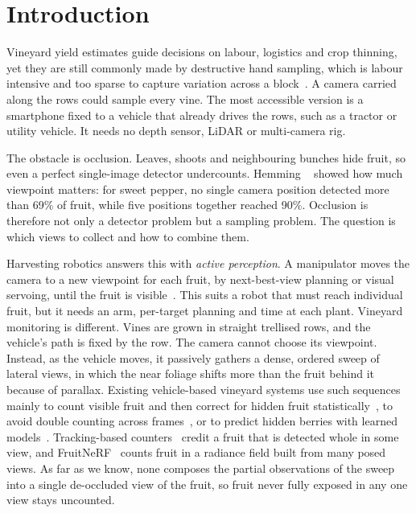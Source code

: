 \section{Introduction}
Vineyard yield estimates guide decisions on labour, logistics and crop thinning, yet they are still commonly made by destructive hand sampling, which is labour intensive and too sparse to capture variation across a block~\cite{nuske2014}. A camera carried along the rows could sample every vine. The most accessible version is a smartphone fixed to a vehicle that already drives the rows, such as a tractor or utility vehicle. It needs no depth sensor, LiDAR or multi-camera rig.

The obstacle is occlusion. Leaves, shoots and neighbouring bunches hide fruit, so even a perfect single-image detector undercounts. Hemming \etal~\cite{hemming2014} showed how much viewpoint matters: for sweet pepper, no single camera position detected more than 69\% of fruit, while five positions together reached 90\%. Occlusion is therefore not only a detector problem but a sampling problem. The question is which views to collect and how to combine them.

Harvesting robotics answers this with \emph{active perception}. A manipulator moves the camera to a new viewpoint for each fruit, by next-best-view planning or visual servoing, until the fruit is visible~\cite{magalhaes2022,burusa2024}. This suits a robot that must reach individual fruit, but it needs an arm, per-target planning and time at each plant. Vineyard monitoring is different. Vines are grown in straight trellised rows, and the vehicle's path is fixed by the row. The camera cannot choose its viewpoint. Instead, as the vehicle moves, it passively gathers a dense, ordered sweep of lateral views, in which the near foliage shifts more than the fruit behind it because of parallax. Existing vehicle-based vineyard systems use such sequences mainly to count visible fruit and then correct for hidden fruit statistically~\cite{nuske2014,millan2018}, to avoid double counting across frames~\cite{santos2020,liu2019}, or to predict hidden berries with learned models~\cite{quinones2025gcnet,kierdorf2022}. Tracking-based counters~\cite{liu2019,santos2020,stein2016} credit a fruit that is detected whole in some view, and FruitNeRF~\cite{meyer2024fruitnerf} counts fruit in a radiance field built from many posed views. As far as we know, none composes the partial observations of the sweep into a single de-occluded view of the fruit, so fruit never fully exposed in any one view stays uncounted.

